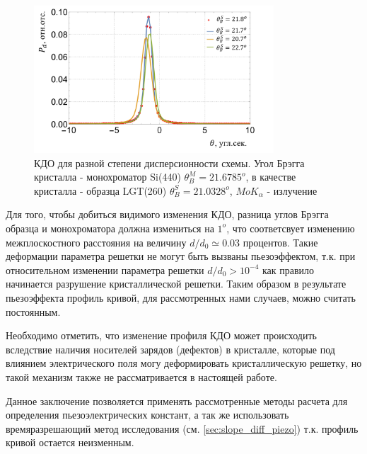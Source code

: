 \begin{figure}[H]
  \centering
  \includegraphics[width=0.8\textwidth]{images/FWHM_diference_bragg_KDO.png}
  \caption{КДО для разной степени дисперсионности схемы. Угол Брэгга кристалла - монохроматор
  Si(440) $\theta_B^M = 21.6785 ^o$, в качестве кристалла - образца LGT(260) $\theta_B^S = 21.0328 ^o$, $MoK_{\alpha}$ - излучение
  }
  \label{ris:FWHM_diference_bragg_KDO}
\end{figure}

Для того, чтобы добиться видимого изменения КДО, разница углов Брэгга образца и монохроматора
должна измениться на $1^o$, что соответсвует изменению межплоскостного расстояния на величину $d/d_0 \simeq 0.03$
процентов. Такие деформации параметра решетки не могут быть вызваны пьезоэффектом,
т.к. при относительном изменении параметра решетки $d/d_0 > 10^{-4}$ как правило
начинается разрушение кристаллической решетки. Таким образом в результате пьезоэффекта профиль кривой,
для рассмотренных нами случаев, можно считать постоянным.

Необходимо отметить, что изменение профиля КДО может происходить вследствие наличия
носителей зарядов (дефектов) в кристалле, которые под влиянием электрического поля
 могу деформировать кристаллическую решетку, но такой механизм
также не рассматривается в настоящей работе.

Данное заключение позволяется применять рассмотренные методы расчета для определения пьезоэлектрических констант,
а так же использовать времяразрешающий метод исследования (см. \ref{sec:slope_diff_piezo})
т.к. профиль кривой остается неизменным.
